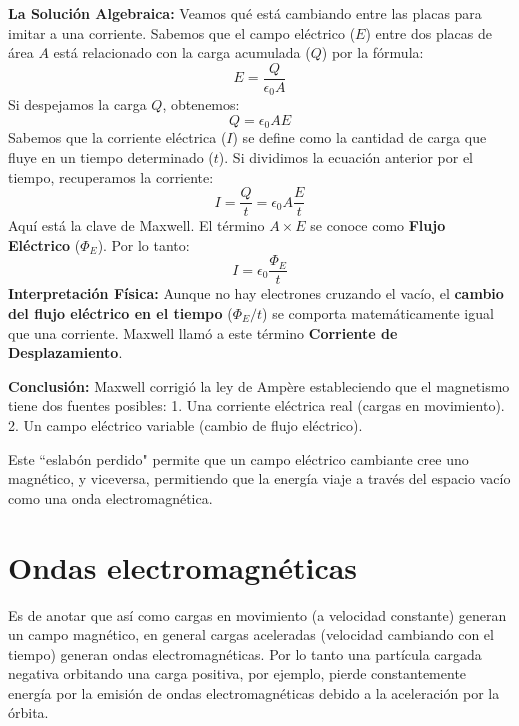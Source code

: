 \documentclass[11pt,a4paper]{book}
\begin{document}
\textbf{La Solución Algebraica:}
Veamos qué está cambiando entre las placas para imitar a una corriente.
Sabemos que el campo eléctrico ($E$) entre dos placas de área $A$ está relacionado con la carga acumulada ($Q$) por la fórmula:
\begin{equation}
    E = \frac{Q}{\epsilon_0 A}
\end{equation}
Si despejamos la carga $Q$, obtenemos:
\begin{equation}
    Q = \epsilon_0 A E
\end{equation}
Sabemos que la corriente eléctrica ($I$) se define como la cantidad de carga que fluye en un tiempo determinado ($t$). Si dividimos la ecuación anterior por el tiempo, recuperamos la corriente:
\begin{equation}
    I = \frac{Q}{t} = \epsilon_0 A \frac{E}{t}
\end{equation}
Aquí está la clave de Maxwell. El término $A \times E$ se conoce como \textbf{Flujo Eléctrico} ($\Phi_E$). Por lo tanto:
\begin{equation}
    I = \epsilon_0 \frac{\Phi_E}{t}
\end{equation}
\textbf{Interpretación Física:}
Aunque no hay electrones cruzando el vacío, el \textbf{cambio del flujo eléctrico en el tiempo} ($\Phi_E / t$) se comporta matemáticamente igual que una corriente.
Maxwell llamó a este término \textbf{Corriente de Desplazamiento}.

\textbf{Conclusión:}
Maxwell corrigió la ley de Ampère estableciendo que el magnetismo tiene dos fuentes posibles:
1. Una corriente eléctrica real (cargas en movimiento).
2. Un campo eléctrico variable (cambio de flujo eléctrico).

Este ``eslabón perdido" permite que un campo eléctrico cambiante cree uno magnético, y viceversa, permitiendo que la energía viaje a través del espacio vacío como una onda electromagnética.




\section{Ondas electromagnéticas}
Es de anotar que así como cargas en movimiento (a velocidad constante) generan un campo magnético, en general cargas aceleradas (velocidad cambiando con el tiempo) generan ondas electromagnéticas. Por lo tanto una partícula cargada negativa orbitando una carga positiva, por ejemplo, pierde constantemente energía por la emisión de ondas electromagnéticas debido a la aceleración por la órbita.
\end{document}
